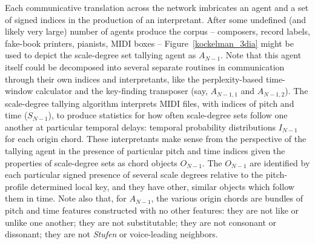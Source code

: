Each communicative translation across the network imbricates an agent and a set of signed indices in the production of an interpretant.  After some undefined (and likely very large) number of agents produce the corpus -- composers, record labels, fake-book printers, pianists, MIDI boxes -- Figure~\ref{kockelman_3dia} might be used to depict the scale-degree set tallying agent as $A_{N-1}$.  Note that this agent itself could be decomposed into several separate routines in communication through their own indices and interpretants, like the perplexity-based time-window calculator and the key-finding transposer (say, $A_{N-1,1}$ and $A_{N-1,2}$).  The scale-degree tallying algorithm interprets MIDI files, with indices of pitch and time ($S_{N-1}$), to produce statistics for how often scale-degree sets follow one another at particular temporal delays: temporal probability distributions $I_{N-1}$ for each origin chord.  These interpretants make sense from the perspective of the tallying agent in the presence of particular pitch and time indices given the properties of scale-degree sets as chord objects $O_{N-1}$.  The $O_{N-1}$ are identified by each particular signed presence of several scale degrees relative to the pitch-profile determined local key, and they have other, similar objects which follow them in time.  Note also that, for $A_{N-1}$, the various origin chords are bundles of pitch and time features constructed with no other features: they are not like or unlike one another; they are not substitutable; they are not consonant or dissonant; they are not \emph{Stufen} or voice-leading neighbors.

